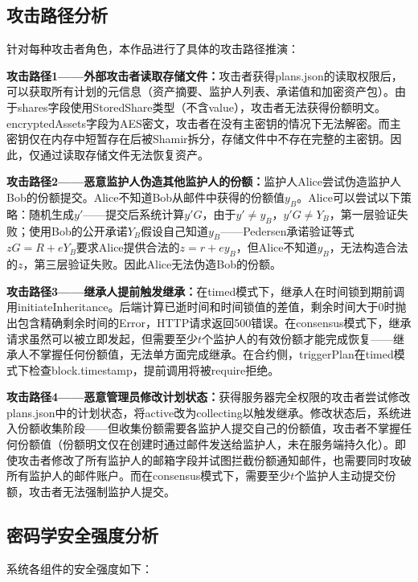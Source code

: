 \documentclass[UTF8,a4paper,zihao=-4,openany]{ctexrep}
\begin{document}
\subsection{攻击路径分析}

针对每种攻击者角色，本作品进行了具体的攻击路径推演：

\textbf{攻击路径1——外部攻击者读取存储文件：}攻击者获得plans.json的读取权限后，可以获取所有计划的元信息（资产摘要、监护人列表、承诺值和加密资产包）。由于shares字段使用StoredShare类型（不含value），攻击者无法获得份额明文。encryptedAssets字段为AES密文，攻击者在没有主密钥的情况下无法解密。而主密钥仅在内存中短暂存在后被Shamir拆分，存储文件中不存在完整的主密钥。因此，仅通过读取存储文件无法恢复资产。

\textbf{攻击路径2——恶意监护人伪造其他监护人的份额：}监护人Alice尝试伪造监护人Bob的份额提交。Alice不知道Bob从邮件中获得的份额值$y_B$。Alice可以尝试以下策略：随机生成$y'$——提交后系统计算$y'G$，由于$y' \neq y_B$，$y'G \neq Y_B$，第一层验证失败；使用Bob的公开承诺$Y_B$假设自己知道$y_B$——Pedersen承诺验证等式$zG = R + eY_B$要求Alice提供合法的$z = r + ey_B$，但Alice不知道$y_B$，无法构造合法的$z$，第三层验证失败。因此Alice无法伪造Bob的份额。

\textbf{攻击路径3——继承人提前触发继承：}在timed模式下，继承人在时间锁到期前调用initiateInheritance。后端计算已逝时间和时间锁值的差值，剩余时间大于0时抛出包含精确剩余时间的Error，HTTP请求返回500错误。在consensus模式下，继承请求虽然可以被立即发起，但需要至少$t$个监护人的有效份额才能完成恢复——继承人不掌握任何份额值，无法单方面完成继承。在合约侧，triggerPlan在timed模式下检查block.timestamp，提前调用将被require拒绝。

\textbf{攻击路径4——恶意管理员修改计划状态：}获得服务器完全权限的攻击者尝试修改plans.json中的计划状态，将active改为collecting以触发继承。修改状态后，系统进入份额收集阶段——但收集份额需要各监护人提交自己的份额值，攻击者不掌握任何份额值（份额明文仅在创建时通过邮件发送给监护人，未在服务端持久化）。即使攻击者修改了所有监护人的邮箱字段并试图拦截份额通知邮件，也需要同时攻破所有监护人的邮件账户。而在consensus模式下，需要至少$t$个监护人主动提交份额，攻击者无法强制监护人提交。

\subsection{密码学安全强度分析}

系统各组件的安全强度如下：
\end{document}
